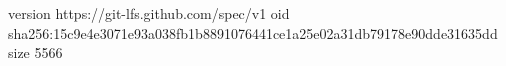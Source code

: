 version https://git-lfs.github.com/spec/v1
oid sha256:15c9e4e3071e93a038fb1b8891076441ce1a25e02a31db79178e90dde31635dd
size 5566

